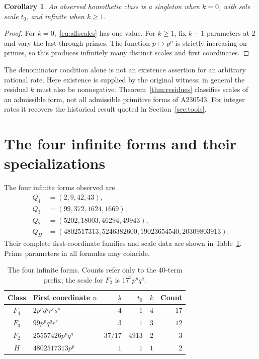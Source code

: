 \documentclass[11pt]{article}
\newtheorem{corollary}[theorem]{Corollary}
\theoremstyle{definition}
\begin{document}
\begin{corollary}\label{cor:singleton}
An observed homothetic class is a singleton when $k=0$, with sole scale
$t_0$, and infinite when $k\ge1$.
\end{corollary}
\begin{proof}
For $k=0$,~\eqref{eq:allscales} has one value. For $k\ge1$, fix
$k-1$ parameters at 2 and vary the last through primes. The function
$p\mapsto p^p$ is strictly increasing on primes, so this produces
infinitely many distinct scales and first coordinates.
\end{proof}
The denominator condition alone is not an existence assertion for an
arbitrary rational rate. Here existence is supplied by the original
witness; in general the residual $k$ must also be nonnegative.
Theorem~\ref{thm:residues} classifies scales of an admissible form, not
all admissible primitive forms of A230543. For integer rates it recovers
the historical result quoted in Section~\ref{sec:tools}.

\section{The four infinite forms and their specializations}\label{sec:families}
The four infinite forms observed are
\begin{align*}
 Q_4&=(2,9,42,43),\\
 Q_3&=(99,372,1624,1669),\\
 Q_2&=(5202,18003,46294,49943),\\
 Q_H&=(4802517313,5246382600,19023654540,20309803913).
\end{align*}
Their complete first-coordinate families and scale data are shown in
Table~\ref{tab:families}. Prime parameters in all formulas may coincide.

\begin{table}[ht]
\centering\small
\begin{tabular}{clrrrr}
\toprule
Class & First coordinate $n$ & $\lambda$ & $t_0$ & $k$ & Count\\
\midrule
$F_4$ & $2p^pq^qr^rs^s$ & $4$ & $1$ & $4$ & $17$\\
$F_3$ & $99p^pq^qr^r$ & $3$ & $1$ & $3$ & $12$\\
$F_2$ & $25557426p^pq^q$ & $37/17$ & $4913$ & $2$ & $3$\\
$H$ & $4802517313p^p$ & $1$ & $1$ & $1$ & $2$\\
\bottomrule
\end{tabular}
\caption{The four infinite forms. Counts refer only to the 40-term prefix;
the scale for $F_2$ is $17^3p^pq^q$.}\label{tab:families}
\end{table}
\end{document}
